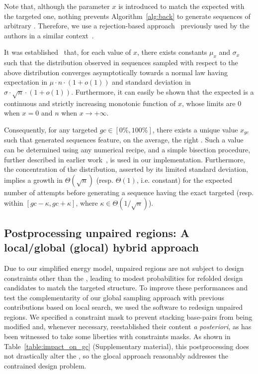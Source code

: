 Note that, although the parameter $x$ is introduced to match the expected \GCContent with the targeted one, nothing prevents Algorithm~\ref{alg:back} to generate sequences of arbitrary \GCContent. Therefore, we use a rejection-based approach~\cite{Bodini2010} previously used by the authors in a similar context~\cite{Waldispuhl2011}.

It was established~\cite{Waldispuhl2011} that, for each value of $x$, there exists constants $\mu_x$ and $\sigma_x$ such that the \GCContent distribution observed in sequences sampled with respect to the above distribution converges asymptotically towards a normal law having expectation in $\mu\cdot n\cdot(1+o(1))$ and standard deviation in $\sigma\cdot\sqrt{n}\cdot(1+o(1))$.
Furthermore, it can easily be shown that the expected \GCContent is a continuous and strictly increasing monotonic  function of $x$, whose limits are $0$ when $x=0$ and $n$ when $x\to +\infty$. 

Consequently, for any targeted \GCContent $gc\in[0\%,100\%]$, there exists a unique value $x_{gc}$ such that generated sequences feature, on the average, the right \GCContent. Such a value can be determined using any numerical recipe, and a simple bisection procedure, further described in earlier work~\cite{Waldispuhl2011}, is used in our implementation. Furthermore, the concentration of the distribution, asserted by its limited standard deviation, implies a growth in $\Theta(\sqrt{n})$ (resp. $\Theta(1)$, i.e. constant) for the expected number of attempts before generating a sequence having the exact targeted \GCContent  (resp. within $[gc-\kappa,gc+\kappa]$, where $\kappa\in\Theta(1/\sqrt n)$).



\subsection{Postprocessing unpaired regions: A local/global (glocal) hybrid approach}
\label{subsec:glocal_method}
Due to our simplified energy model, unpaired regions are not subject to design constraints other than the \GCContent, leading to modest probabilities for refolded design candidates to match the targeted structure. To improve these performances and test the complementarity  of our global sampling approach with previous contributions based on local search, we used the \RNAinverse software to redesign unpaired regions. We specified a constraint mask to prevent stacking base-pairs from being modified and, whenever necessary, reestablished their content {\em a posteriori}, as \RNAinverse has been witnessed to take some liberties with constraints masks. As shown in Table~\ref{table:impact_on_gc} (Supplementary material), this postprocessing does not drastically alter the \GCContent, so the glocal approach reasonably addresses the contrained \GCContent design problem.


